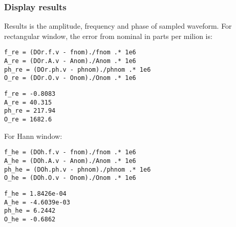 {}
\subsubsection*{Display results}



Results is the amplitude, frequency and phase of sampled waveform. For rectangular window, the
error from nominal in parts per milion is:

\begin{lstlisting}
f_re = (DOr.f.v - fnom)./fnom .* 1e6
A_re = (DOr.A.v - Anom)./Anom .* 1e6
ph_re = (DOr.ph.v - phnom)./phnom .* 1e6
O_re = (DOr.O.v - Onom)./Onom .* 1e6
\end{lstlisting}
\begin{lstlisting}[language={},xleftmargin=5pt,frame=none]
f_re = -0.8083
A_re = 40.315
ph_re = 217.94
O_re = 1682.6

\end{lstlisting}


For Hann window:

\begin{lstlisting}
f_he = (DOh.f.v - fnom)./fnom .* 1e6
A_he = (DOh.A.v - Anom)./Anom .* 1e6
ph_he = (DOh.ph.v - phnom)./phnom .* 1e6
O_he = (DOh.O.v - Onom)./Onom .* 1e6
\end{lstlisting}
\begin{lstlisting}[language={},xleftmargin=5pt,frame=none]
f_he = 1.8426e-04
A_he = -4.6039e-03
ph_he = 6.2442
O_he = -0.6862

\end{lstlisting}


\stopcontents[localtoc]
